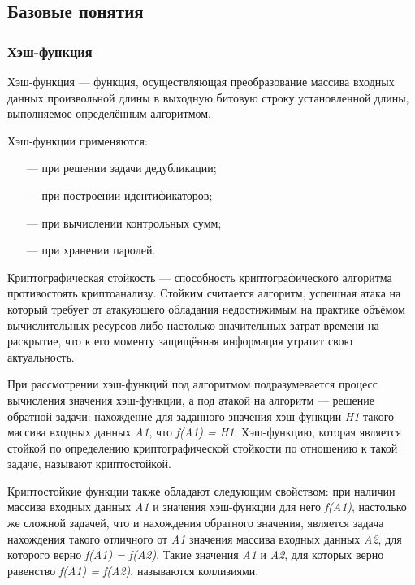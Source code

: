 \subsection{Базовые понятия}

\subsubsection{Хэш-функция}

Хэш-функция\cite{hash} --- функция, осуществляющая преобразование массива входных данных произвольной длины в выходную битовую строку установленной длины, выполняемое определённым алгоритмом.

Хэш-функции применяются:
\begin{itemize}
    \item[---] при решении задачи дедубликации;
    \item[---] при построении идентификаторов;
    \item[---] при вычислении контрольных сумм;
    \item[---] при хранении паролей.
\end{itemize}

Криптографическая стойкость \cite{crypto} --- способность криптографического алгоритма противостоять криптоанализу. Стойким считается алгоритм, успешная атака на который требует от атакующего обладания недостижимым на практике объёмом вычислительных ресурсов либо настолько значительных затрат времени на раскрытие, что к его моменту защищённая информация утратит свою актуальность.

При рассмотрении хэш-функций под алгоритмом подразумевается процесс вычисления значения хэш-функции, а под атакой на алгоритм --- решение обратной задачи: нахождение для заданного значения хэш-функции \textit{H1} такого массива входных данных \textit{A1}, что \textit{f(A1) = H1}. Хэш-функцию, которая является стойкой по определению криптографической стойкости по отношению к такой задаче, называют криптостойкой.

Криптостойкие функции также обладают следующим свойством: при наличии массива входных данных \textit{A1} и значения хэш-функции для него \textit{f(A1)}, настолько же сложной задачей, что и нахождения обратного значения, является задача нахождения такого отличного от \textit{A1} значения массива входных данных \textit{A2}, для которого верно \textit{f(A1) = f(A2)}. Такие значения \textit{A1} и \textit{A2}, для которых верно равенство \textit{f(A1) = f(A2)}, называются коллизиями.

